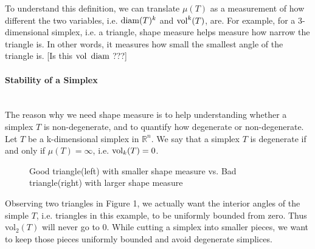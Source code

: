     To understand this definition, we can translate $\mu({{T}})$ as a measurement of how different the two variables, i.e. $\operatorname{diam}({T})^k$ and $\operatorname{vol}^k({T})$, are. For example, for a 3-dimensional simplex, i.e. a triangle, shape measure helps measure how narrow the triangle is. In other words, it measures how small the smallest angle of the triangle is. [Is this $\operatorname{vol}~\operatorname{diam}$ ???]

    \paragraph{Stability of a Simplex}\mbox{}\\
    The reason why we need shape measure is to help understanding whether a simplex $T$ is non-degenerate, and to quantify how degenerate or non-degenerate. Let $T$ be a k-dimensional simplex in $\mathbb{R}^n$. We say that a simplex $T$ is degenerate if and only if $\mu({T}) = \infty$, i.e. $\operatorname{vol}_k(T) = 0$. 

    
    \begin{figure}
    \centering
    \caption{Good triangle(left) with smaller shape measure vs. Bad triangle(right) with larger shape measure}
    \label{Fig1}
    \end{figure}

    Observing two triangles in Figure 1, we actually want the interior angles of the simple $T$, i.e. triangles in this example, to be uniformly bounded from zero. Thus vol$_2(T)$ will never go to 0.
    While cutting a simplex into smaller pieces, we want to keep those pieces uniformly bounded and avoid degenerate simplices. \\

